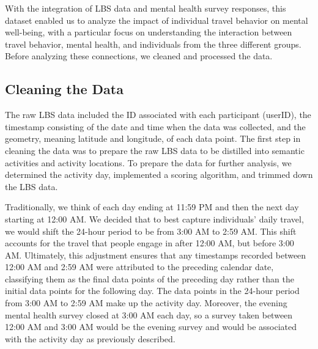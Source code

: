 \documentclass[
  letterpaper,
  number,
  review,
  3p]{elsarticle}
\begin{document}
With the integration of LBS data and mental health survey responses,
this dataset enabled us to analyze the impact of individual travel
behavior on mental well-being, with a particular focus on understanding
the interaction between travel behavior, mental health, and individuals
from the three different groups. Before analyzing these connections, we
cleaned and processed the data.

\subsection{Cleaning the Data}\label{cleaning-the-data}

The raw LBS data included the ID associated with each participant
(userID), the timestamp consisting of the date and time when the data
was collected, and the geometry, meaning latitude and longitude, of each
data point. The first step in cleaning the data was to prepare the raw
LBS data to be distilled into semantic activities and activity
locations. To prepare the data for further analysis, we determined the
activity day, implemented a scoring algorithm, and trimmed down the LBS
data.

Traditionally, we think of each day ending at 11:59 PM and then the next
day starting at 12:00 AM. We decided that to best capture individuals'
daily travel, we would shift the 24-hour period to be from 3:00 AM to
2:59 AM. This shift accounts for the travel that people engage in after
12:00 AM, but before 3:00 AM. Ultimately, this adjustment ensures that
any timestamps recorded between 12:00 AM and 2:59 AM were attributed to
the preceding calendar date, classifying them as the final data points
of the preceding day rather than the initial data points for the
following day. The data points in the 24-hour period from 3:00 AM to
2:59 AM make up the activity day. Moreover, the evening mental health
survey closed at 3:00 AM each day, so a survey taken between 12:00 AM
and 3:00 AM would be the evening survey and would be associated with the
activity day as previously described.
\end{document}
